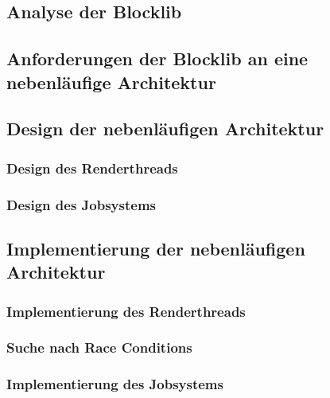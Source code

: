 \documentclass[12pt,a4paper,listof=totocnumbered,parskip=half,numbers=noenddot]{scrartcl}
\begin{document}
\subsection{Analyse der Blocklib}\label{sec:blocklibAnalyse}


\subsection{Anforderungen der Blocklib an eine nebenläufige Architektur}\label{sec:anforderungen}


\subsection{Design der nebenläufigen Architektur}

\pagebreak
\subsubsection{Design des Renderthreads}\label{sec:desgignRenderthread}

\subsubsection{Design des Jobsystems}\label{sec:desgignJobsystem}


\subsection{Implementierung der nebenläufigen Architektur}

\subsubsection{Implementierung des Renderthreads}


\subsubsection{Suche nach Race Conditions}\label{sec:searchRace}

\subsubsection{Implementierung des Jobsystems}

\end{document}
